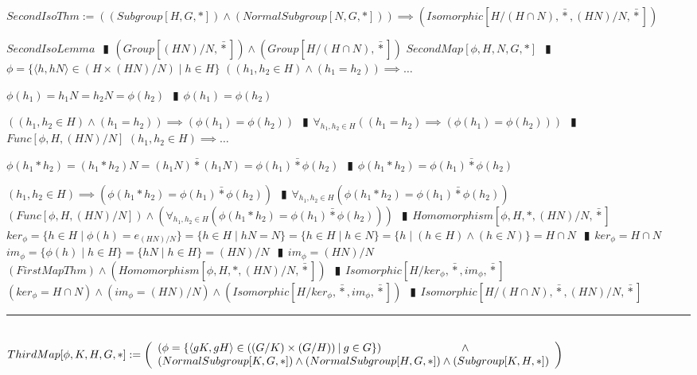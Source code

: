 \documentclass{book}
\newcommand{\abr}{:=}
\newcommand{\pipe}{$\phantom{(}\vrectangleblack\phantom{)}$}
\newcommand{\bbin}[1]{\mathbin{{\bar{#1}}}}
\newcommand{\st}{\mathbin{|}}
\begin{document}
$SecondIsoThm \abr ((Subgroup[H, G, *]) \land (NormalSubgroup[N, G, *])) \implies (Isomorphic[H / (H \cap N), \bbin{*}, (H N) / N, \bbin{*}])$
\begin{enumerate}
  \lit $SecondIsoLemma$ \pipe $(Group[(H N) / N, \bbin{*}]) \land (Group[H / (H \cap N), \bbin{*}])$
  \lit $SecondMap[\phi, H, N, G, *]$ \pipe $\phi = \{\langle h, h N \rangle \in (H \times (H N) / N) \st h \in H\}$
  \lit $((h_1, h_2 \in H) \land (h_1 = h_2)) \implies \ldots$
  \begin{enumerate}
    \lit $\phi(h_1) = h_1 N = h_2 N = \phi(h_2)$ \pipe $\phi(h_1) = \phi(h_2)$
  \end{enumerate}
  \lit $((h_1, h_2 \in H) \land (h_1 = h_2)) \implies (\phi(h_1) = \phi(h_2))$ \pipe $\forall_{h_1, h_2 \in H}((h_1 = h_2) \implies (\phi(h_1) = \phi(h_2)))$ \pipe $Func[\phi, H, (H N) / N]$
  \lit $(h_1, h_2 \in H) \implies \ldots$
  \begin{enumerate}
    \lit $\phi(h_1 * h_2) = (h_1 * h_2) N = (h_1 N) \bbin{*} (h_1 N) = \phi(h_1) \bbin{*} \phi(h_2)$ \pipe $\phi(h_1 * h_2) = \phi(h_1) \bbin{*} \phi(h_2)$  %
  \end{enumerate}
  \lit $(h_1, h_2 \in H) \implies (\phi(h_1 * h_2) = \phi(h_1) \bbin{*} \phi(h_2))$ \pipe $\forall_{h_1, h_2 \in H}(\phi(h_1 * h_2) = \phi(h_1) \bbin{*} \phi(h_2))$
  \lit $(Func[\phi, H, (H N) / N]) \land (\forall_{h_1, h_2 \in H}(\phi(h_1 * h_2) = \phi(h_1) \bbin{*} \phi(h_2)))$ \pipe $Homomorphism[\phi, H, *, (H N) / N, \bbin{*}]$
  \lit $ker_\phi = \{h \in H \st \phi(h) = e_{(H N) / N}\} = \{h \in H \st h N = N\} = \{h \in H \st h \in N\} = \{h \st (h \in H) \land (h \in N)\} = H \cap N$ \pipe $ker_\phi = H \cap N$
  \lit $im_\phi = \{\phi(h) \st h \in H\} = \{h N \st h \in H\} = (H N) / N$ \pipe $im_\phi = (H N) / N$
  \lit $(FirstMapThm) \land (Homomorphism[\phi, H, *, (H N) / N, \bbin{*}])$ \pipe $Isomorphic[H / ker_\phi, \bbin{*}, im_\phi, \bbin{*}]$
  \lit $(ker_\phi = H \cap N) \land (im_\phi = (H N) / N) \land (Isomorphic[H / ker_\phi, \bbin{*}, im_\phi, \bbin{*}])$ \pipe $Isomorphic[H / (H \cap N), \bbin{*}, (H N) / N, \bbin{*}]$
\end{enumerate} \vspace{.75mm} \hrule \vspace{.75mm} \ \\

$ThirdMap[\phi, K, H, G, *] \abr \left(\begin{array}{ll}
  (\phi = \{\langle g K, g H \rangle \in ((G / K) \times (G / H)) \st g \in G\}) \hfill \land \hfill \\
  (NormalSubgroup[K, G, *]) \hfill \land \hfill (NormalSubgroup[H, G, *]) \hfill \land \hfill (Subgroup[K, H, *])
\end{array}\right)$ \\
\end{document}
